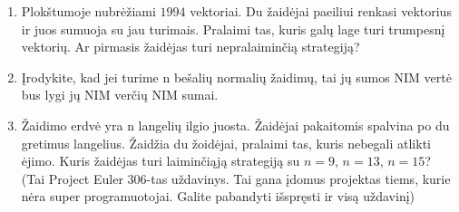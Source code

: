 \begin{enumerate}
  \item Plokštumoje nubrėžiami $1994$ vektoriai. Du žaidėjai paeiliui renkasi
    vektorius ir juos sumuoja su jau turimais. Pralaimi tas, kuris galų lage
    turi trumpesnį vektorių. Ar pirmasis žaidėjas turi nepralaiminčią
    strategiją?

  \item Įrodykite, kad jei turime n bešalių normalių žaidimų, tai jų sumos NIM
    vertė bus lygi jų NIM verčių NIM sumai. 

  \item Žaidimo erdvė yra n langelių ilgio juosta. Žaidėjai pakaitomis spalvina
    po du gretimus langelius. Žaidžia du žoidėjai, pralaimi tas, kuris nebegali
    atlikti ėjimo. Kuris žaidėjas turi laiminčiąją strategiją su $n=9$, $n=13$,
    $n=15$? (Tai Project Euler 306-tas uždavinys. Tai gana įdomus projektas
    tiems, kurie nėra super programuotojai. Galite pabandyti išspręsti ir visą
    uždavinį)


\end{enumerate}
